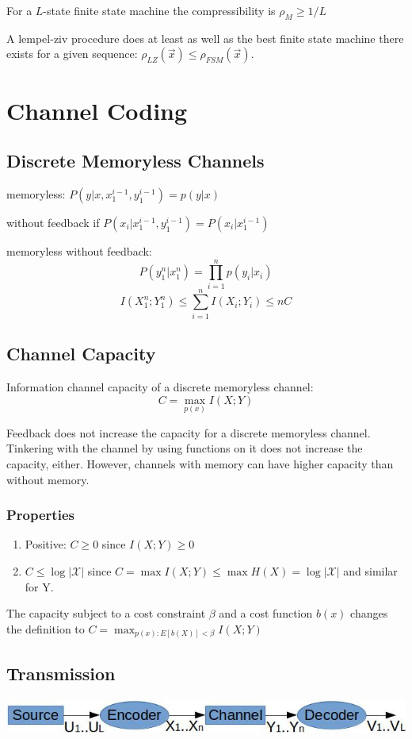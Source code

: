 \documentclass[10pt,a4paper,landscape]{article}
\begin{document}
\begin{multicols*}{4}
For a $L$-state finite state machine the compressibility is $\rho_M \geq 1/L$

A lempel-ziv procedure does at least as well as the best finite state machine there exists for a given sequence: $\rho_{LZ}(\vec x) \leq \rho_{FSM}(\vec x)$.

\section{Channel Coding}
\subsection{Discrete Memoryless Channels}
memoryless: $P(y|x, x_1^{i-1}, y_1^{i-1}) = p(y|x)$

without feedback if $P(x_i|x_1^{i-1},y_1^{i-1}) = P(x_i|x_1^{i-1})$

memoryless without feedback: $$P(y_1^n | x_1^n) = \prod_{i=1}^n p(y_i|x_i)$$
$$I(X_1^n;Y_1^n) \leq \sum_{i=1}^n I(X_i;Y_i) \leq nC$$

\subsection{Channel Capacity}
Information channel capacity of a discrete memoryless channel:
$$C = \max_{p(x)} I(X; Y)$$

Feedback does not increase the capacity for a discrete memoryless channel. Tinkering with the channel by using functions on it does not increase the capacity, either. However, channels with memory can have higher capacity than without memory.

\subsubsection{Properties}
\begin{enumerate}
	\item Positive: $C \geq 0$ since $I(X; Y) \geq 0$
	\item $C \leq \log | \mathcal{X} |$ since $C = \max I(X; Y) \leq \max H(X) =  \log | \mathcal{X} |$ and similar for Y.
\end{enumerate}

The capacity subject to a cost constraint $\beta$ and a cost function $b(x)$ changes the definition to $C = \max_{p(x): E[b(X)] < \beta} I(X; Y)$

\subsection{Transmission}
\begin{colfig}
	\centering
	\includegraphics[width=\linewidth]{comm-setup.png}
\end{colfig}


\end{multicols*}
\end{document}
